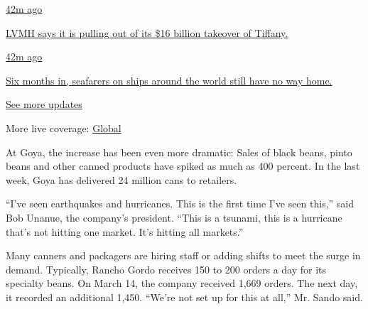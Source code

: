 \href{https://www.nytimes3xbfgragh.onion/live/2020/09/09/business/stock-market-today-coronavirus?action=click\&pgtype=Article\&state=default\&region=MAIN_CONTENT_1\&context=storylines_live_updates\#lvmh-says-it-is-pulling-out-of-its-16-billion-takeover-of-tiffany}{42m
ago}

\href{https://www.nytimes3xbfgragh.onion/live/2020/09/09/business/stock-market-today-coronavirus?action=click\&pgtype=Article\&state=default\&region=MAIN_CONTENT_1\&context=storylines_live_updates\#lvmh-says-it-is-pulling-out-of-its-16-billion-takeover-of-tiffany}{LVMH
says it is pulling out of its \$16 billion takeover of Tiffany.}

\href{https://www.nytimes3xbfgragh.onion/live/2020/09/09/business/stock-market-today-coronavirus?action=click\&pgtype=Article\&state=default\&region=MAIN_CONTENT_1\&context=storylines_live_updates\#six-months-in-seafarers-on-ships-around-the-world-still-have-no-way-home}{42m
ago}

\href{https://www.nytimes3xbfgragh.onion/live/2020/09/09/business/stock-market-today-coronavirus?action=click\&pgtype=Article\&state=default\&region=MAIN_CONTENT_1\&context=storylines_live_updates\#six-months-in-seafarers-on-ships-around-the-world-still-have-no-way-home}{Six
months in, seafarers on ships around the world still have no way home.}

\href{https://www.nytimes3xbfgragh.onion/live/2020/09/09/business/stock-market-today-coronavirus?action=click\&pgtype=Article\&state=default\&region=MAIN_CONTENT_1\&context=storylines_live_updates}{See
more updates}

More live coverage:
\href{https://www.nytimes3xbfgragh.onion/2020/09/09/world/covid-19-coronavirus.html?action=click\&pgtype=Article\&state=default\&region=MAIN_CONTENT_1\&context=storylines_live_updates}{Global}

At Goya, the increase has been even more dramatic: Sales of black beans,
pinto beans and other canned products have spiked as much as 400
percent. In the last week, Goya has delivered 24 million cans to
retailers.

``I've seen earthquakes and hurricanes. This is the first time I've seen
this,'' said Bob Unanue, the company's president. ``This is a tsunami,
this is a hurricane that's not hitting one market. It's hitting all
markets.''

Many canners and packagers are hiring staff or adding shifts to meet the
surge in demand. Typically, Rancho Gordo receives 150 to 200 orders a
day for its specialty beans. On March 14, the company received 1,669
orders. The next day, it recorded an additional 1,450. ``We're not set
up for this at all,'' Mr. Sando said.

